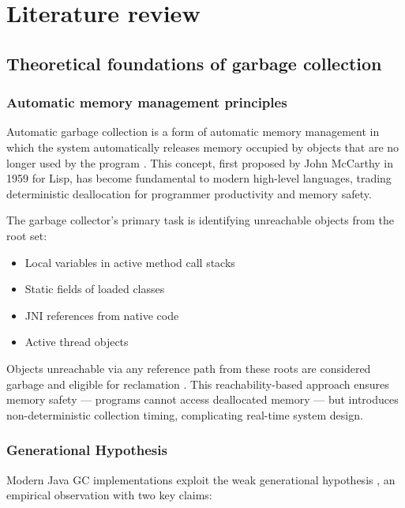 \chapter{Literature review}
\label{chap:lr}

\section{Theoretical foundations of garbage collection}
\label{sec:gc-theory}

\subsection{Automatic memory management principles}
\label{subsec:auto-memory}

Automatic garbage collection is a form of automatic memory management in which the system automatically releases memory occupied by objects that are no longer used by the program \cite{jones2011garbage}. This concept, first proposed by John McCarthy in 1959 for Lisp, has become fundamental to modern high-level languages, trading deterministic deallocation for programmer productivity and memory safety.

The garbage collector's primary task is identifying unreachable objects from the root set:
\begin{itemize}
    \item Local variables in active method call stacks
    \item Static fields of loaded classes
    \item JNI references from native code
    \item Active thread objects
\end{itemize}

Objects unreachable via any reference path from these roots are considered garbage and eligible for reclamation \cite{jones2011garbage, lindholm2014java}. This reachability-based approach ensures memory safety --- programs cannot access deallocated memory --- but introduces non-deterministic collection timing, complicating real-time system design.

\subsection{Generational Hypothesis}
\label{subsec:generational}

Modern Java GC implementations exploit the weak generational hypothesis \cite{jones2011garbage, ungar1984generation}, an empirical observation with two key claims:

